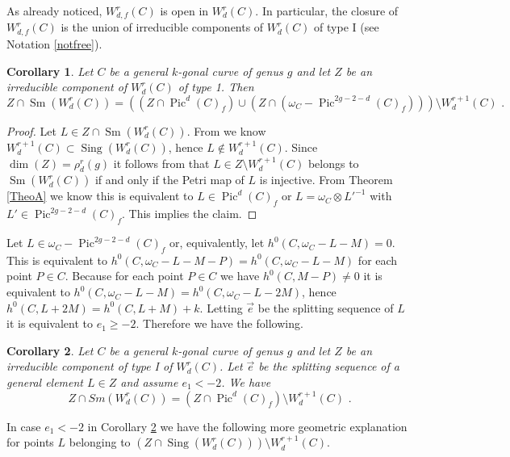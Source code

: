 \documentclass{article}
\DeclareMathOperator{\Pic}{Pic}
\DeclareMathOperator{\Sm}{Sm}
\DeclareMathOperator{\Sing}{Sing}
\newtheorem{corollary}{Corollary}
\theoremstyle{definition}
\theoremstyle{remark}
\begin{document}
As already noticed, $W^r_{d,f}(C)$ is open in $W^r_d(C)$.
In particular, the closure of $W^r_{d,f}(C)$ is the union of irreducible components of $W^r_d(C)$ of type I (see Notation \ref{notfree}).

\begin{corollary}\label{cor2}
Let $C$ be a general $k$-gonal curve of genus $g$ and let $Z$ be an irreducible component of $W^r_d(C)$ of type 1.
Then 
\[
Z \cap \Sm (W^r_d(C))=((Z \cap \Pic^d(C)_f) \cup (Z \cap (\omega _C-\Pic^{2g-2-d}(C)_f)))\setminus W^{r+1}_d(C) \text { .}
\]
\end{corollary}
\begin{proof}
Let $L \in Z \cap \Sm (W^r_d(C))$.
From \cite {ref9} we know $W^{r+1}_d(C) \subset \Sing (W^r_d(C))$, hence $L \notin W^{r+1}_d(C)$.
Since $\dim (Z)=\rho ^r_d(g)$ it follows from \cite {ref9} that $L \in Z \setminus W^{r+1}_d(C)$ belongs to $\Sm (W^r_d(C))$ if and only if the Petri map of $L$ is injective.
From Theorem \ref{TheoA} we know this is equivalent to $L \in \Pic^d(C)_f$ or $L=\omega _C \otimes L'^{-1}$ with $L' \in \Pic^{2g-2-d}(C)_f$.
This implies the claim.
\end{proof}

Let $L \in \omega _C -\Pic^{2g-2-d}(C)_f$ or, equivalently, let $h^0(C,\omega _C-L-M)=0$.
This is equivalent to $h^0(C,\omega _C-L-M-P)=h^0(C,\omega _C-L-M)$ for each point $P \in C$.
Because for each point $P \in C$ we have $h^0(C,M-P) \neq 0$ it is equivalent to $h^0(C,\omega _C-L-M)=h^0(C,\omega _C-L-2M)$, hence $h^0(C,L+2M)=h^0(C,L+M)+k$.
Letting $\overrightarrow {e}$ be the splitting sequence of $L$ it is equivalent to $e_1 \geq -2$.
Therefore we have the following.

\begin{corollary}\label{cor3}
Let $C$ be a general $k$-gonal curve of genus $g$ and let $Z$ be an irreducible component of type I of $W^r_d(C)$.
Let $\overrightarrow {e}$ be the splitting sequence of a general element $L \in Z$ and assume $e_1<-2$.
We have
\[
Z \cap Sm(W^r_d(C))=(Z \cap \Pic^d(C)_f) \setminus W^{r+1}_d(C) \text { .}
\]
\end{corollary}

In case $e_1 <-2$ in Corollary \ref{cor3} we have the following more geometric explanation for points $L$ belonging to $(Z \cap \Sing (W^r_d(C))) \setminus W^{r+1}_d(C)$.
\end{document}
